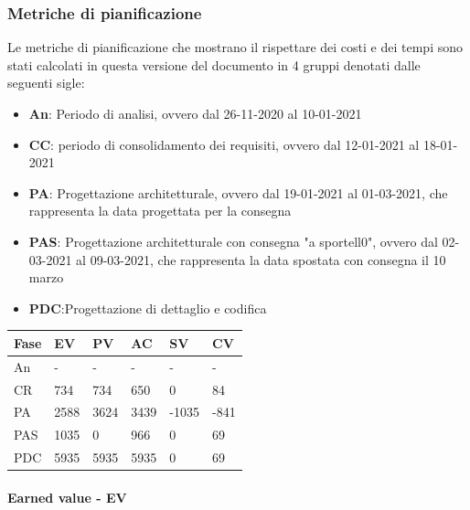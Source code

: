 \subsubsection{Metriche di pianificazione}
    Le metriche di pianificazione che mostrano il rispettare dei costi e dei tempi sono stati calcolati in questa versione del documento in 4 gruppi denotati dalle seguenti sigle:
    \begin{itemize}
        \item \textbf{An}: Periodo di analisi, ovvero dal 26-11-2020 al 10-01-2021
        \item \textbf{CC}: periodo di consolidamento dei requisiti, ovvero dal 12-01-2021 al 18-01-2021
        \item \textbf{PA}: Progettazione architetturale, ovvero dal 19-01-2021 al 01-03-2021, che rappresenta la data progettata per la consegna
        \item \textbf{PAS}: Progettazione architetturale con consegna "a sportell0", ovvero dal 02-03-2021 al 09-03-2021, che rappresenta la data spostata con consegna il 10 marzo
        \item \textbf{PDC}:Progettazione di dettaglio e codifica
    \end{itemize}
    
    
    \begin{longtabu} to \textwidth {| X[0.1,c m] | X[0.1,c m]| X[0.1,c m]| X[0.1,c m]| X[0.1,c m]| X[0.1,c m] |}
        \hline
        \textbf{Fase} &
        \textbf{EV} &
        \textbf{PV} &
        \textbf{AC} &
        \textbf{SV} &
        \textbf{CV} \\
        \hline
        An & - & - & - & - & -  \\ 
        \hline
        CR & 734 & 734 & 650 & 0 & 84 \\
        \hline
        PA & 2588 & 3624 & 3439 & -1035 & -841\\
        \hline
        PAS & 1035 & 0 & 966 & 0 & 69 \\
        \hline
        PDC & 5935 & 5935 & 5935 & 0 & 69 \\
        \hline 
        \end{longtabu}

        \paragraph{Earned value - EV}

